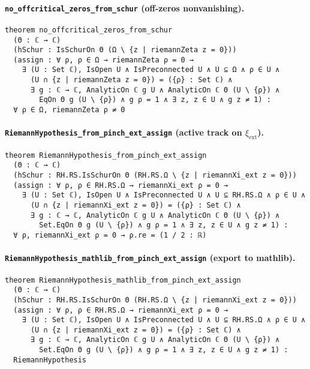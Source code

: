 \documentclass[11pt]{article}
\theoremstyle{plain}
\theoremstyle{definition}
\begin{document}
\paragraph{\texttt{no\_offcritical\_zeros\_from\_schur} (off-zeros nonvanishing).}
{\small
\begin{verbatim}
theorem no_offcritical_zeros_from_schur
  (Θ : ℂ → ℂ)
  (hSchur : IsSchurOn Θ (Ω \ {z | riemannZeta z = 0}))
  (assign : ∀ ρ, ρ ∈ Ω → riemannZeta ρ = 0 →
    ∃ (U : Set ℂ), IsOpen U ∧ IsPreconnected U ∧ U ⊆ Ω ∧ ρ ∈ U ∧
      (U ∩ {z | riemannZeta z = 0}) = ({ρ} : Set ℂ) ∧
      ∃ g : ℂ → ℂ, AnalyticOn ℂ g U ∧ AnalyticOn ℂ Θ (U \ {ρ}) ∧
        EqOn Θ g (U \ {ρ}) ∧ g ρ = 1 ∧ ∃ z, z ∈ U ∧ g z ≠ 1) :
  ∀ ρ ∈ Ω, riemannZeta ρ ≠ 0
\end{verbatim}
}

\paragraph{\texttt{RiemannHypothesis\_from\_pinch\_ext\_assign} (active track on \(\xi_{\mathrm{ext}}\)).}
{\small
\begin{verbatim}
theorem RiemannHypothesis_from_pinch_ext_assign
  (Θ : ℂ → ℂ)
  (hSchur : RH.RS.IsSchurOn Θ (RH.RS.Ω \ {z | riemannXi_ext z = 0}))
  (assign : ∀ ρ, ρ ∈ RH.RS.Ω → riemannXi_ext ρ = 0 →
    ∃ (U : Set ℂ), IsOpen U ∧ IsPreconnected U ∧ U ⊆ RH.RS.Ω ∧ ρ ∈ U ∧
      (U ∩ {z | riemannXi_ext z = 0}) = ({ρ} : Set ℂ) ∧
      ∃ g : ℂ → ℂ, AnalyticOn ℂ g U ∧ AnalyticOn ℂ Θ (U \ {ρ}) ∧
        Set.EqOn Θ g (U \ {ρ}) ∧ g ρ = 1 ∧ ∃ z, z ∈ U ∧ g z ≠ 1) :
  ∀ ρ, riemannXi_ext ρ = 0 → ρ.re = (1 / 2 : ℝ)
\end{verbatim}
}

\paragraph{\texttt{RiemannHypothesis\_mathlib\_from\_pinch\_ext\_assign} (export to mathlib).}
{\small
\begin{verbatim}
theorem RiemannHypothesis_mathlib_from_pinch_ext_assign
  (Θ : ℂ → ℂ)
  (hSchur : RH.RS.IsSchurOn Θ (RH.RS.Ω \ {z | riemannXi_ext z = 0}))
  (assign : ∀ ρ, ρ ∈ RH.RS.Ω → riemannXi_ext ρ = 0 →
    ∃ (U : Set ℂ), IsOpen U ∧ IsPreconnected U ∧ U ⊆ RH.RS.Ω ∧ ρ ∈ U ∧
      (U ∩ {z | riemannXi_ext z = 0}) = ({ρ} : Set ℂ) ∧
      ∃ g : ℂ → ℂ, AnalyticOn ℂ g U ∧ AnalyticOn ℂ Θ (U \ {ρ}) ∧
        Set.EqOn Θ g (U \ {ρ}) ∧ g ρ = 1 ∧ ∃ z, z ∈ U ∧ g z ≠ 1) :
  RiemannHypothesis
\end{verbatim}
}
\end{document}
